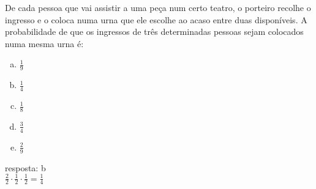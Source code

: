 \begin{ex}
 De cada pessoa que vai assistir a uma peça num certo teatro, o porteiro recolhe o ingresso e o coloca numa urna que ele escolhe ao acaso entre duas disponíveis. A probabilidade de que os ingressos de três determinadas pessoas sejam colocados numa mesma urna é:
    \begin{enumerate}[(a)]
    \item $\frac{1}{9}$
    \item $\frac{1}{4}$
    \item $\frac{1}{8}$
    \item $\frac{3}{4}$
    \item $\frac{2}{9}$
    \end{enumerate}
      \begin{sol}
        resposta: b \\
        $\frac{2}{2}\cdot\frac{1}{2}\cdot\frac{1}{2}=\frac{1}{4}$
      \end{sol}
\end{ex}